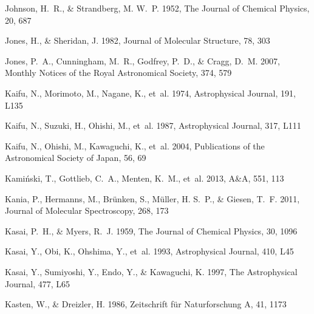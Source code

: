 \documentclass[twocolumn]{aastex631}
\begin{document}
\begin{thebibliography}{}
Johnson, H.~R., \& Strandberg, M. W.~P. 1952, The Journal of Chemical Physics,
  20, 687

Jones, H., \& Sheridan, J. 1982, Journal of Molecular Structure, 78, 303

Jones, P.~A., Cunningham, M.~R., Godfrey, P.~D., \& Cragg, D.~M. 2007, Monthly
  Notices of the Royal Astronomical Society, 374, 579

Kaifu, N., Morimoto, M., Nagane, K., {et~al.} 1974, Astrophysical Journal, 191,
  L135

Kaifu, N., Suzuki, H., Ohishi, M., {et~al.} 1987, Astrophysical Journal, 317,
  L111

Kaifu, N., Ohishi, M., Kawaguchi, K., {et~al.} 2004, Publications of the
  Astronomical Society of Japan, 56, 69

Kami{\'{n}}ski, T., Gottlieb, C.~A., Menten, K.~M., {et~al.} 2013, A{\&}A, 551,
  113

Kania, P., Hermanns, M., Br{\"u}nken, S., M{\"u}ller, H. S.~P., \& Giesen,
  T.~F. 2011, Journal of Molecular Spectroscopy, 268, 173

Kasai, P.~H., \& Myers, R.~J. 1959, The Journal of Chemical Physics, 30, 1096

Kasai, Y., Obi, K., Ohshima, Y., {et~al.} 1993, Astrophysical Journal, 410, L45

Kasai, Y., Sumiyoshi, Y., Endo, Y., \& Kawaguchi, K. 1997, The Astrophysical
  Journal, 477, L65

Kasten, W., \& Dreizler, H. 1986, Zeitschrift f{\"u}r Naturforschung A, 41,
  1173


\end{thebibliography}
\end{document}
